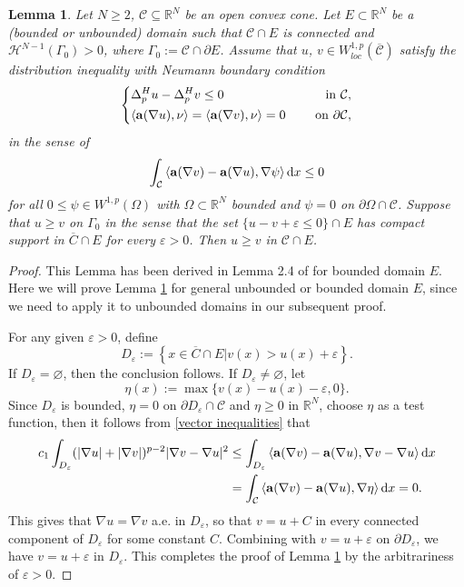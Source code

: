 \documentclass[12pt]{amsart}
\newtheorem{lem}[thm]{Lemma}
\theoremstyle{definition}
\theoremstyle{remark}
\theoremstyle{conclusion}
\theoremstyle{conjecture}
\numberwithin{equation}{section}
\begin{document}
\begin{lem}\label{weak comparison}
Let $N\geq2$, $\mathcal{C}\subseteq\mathbb{R}^{N}$ be an open convex cone. Let $E\subset\mathbb{R}^{N}$ be a (bounded or unbounded) domain such that $\mathcal{C}\cap E$ is connected and $\mathcal{H}^{N-1}(\Gamma_0)>0$, where $\Gamma_0:=\mathcal{C}\cap \partial E$. Assume that $u$, $v\in W^{1,p}_{loc}(\overline{\mathcal{C}})$ satisfy the distribution inequality with Neumann boundary condition
 \begin{equation*}
     \left\{
         \begin{aligned}
             &\Delta ^{H}_{p}u-\Delta ^{H}_{p}v \leq 0\ &\rm{in}\,\, \mathcal{C}, \\
             &\langle {\bf{a}}(\nabla u),\nu\rangle=\langle {\bf{a}}(\nabla v),\nu\rangle=0 \quad\,\, &\rm{on}\,\, \partial\mathcal{C},
             \end{aligned}
             \right.
    \end{equation*}
in the sense of
$$\int_{\mathcal{C}}\left\langle {\bf{a}}(\nabla v)-{\bf{a}}(\nabla u),\nabla \psi\right\rangle \mathrm{d}x\leq0$$
for all $0\leq\psi\in W^{1,p}(\Omega)$ with $\Omega\subset\mathbb{R}^N$ bounded and $\psi=0$ on $\partial\Omega\cap \mathcal{C}$. Suppose that $u\geq v$ on $\Gamma_0$ in the sense that the set $\{u-v+\varepsilon\leq0\}\cap E$ has compact support in $\overline{C}\cap E$ for every $\varepsilon>0$. Then $u\geq v$ in $\mathcal{C}\cap E$.
\end{lem}
\begin{proof}
This Lemma has been derived in Lemma 2.4 of \cite{CL} for bounded domain $E$. Here we will prove Lemma \ref{weak comparison} for general unbounded or bounded domain $E$, since we need to apply it to unbounded domains in our subsequent proof.

For any given $\varepsilon>0$, define
$$D_{\varepsilon}:=\left\{x\in\overline{C}\cap E|v(x)>u(x)+\varepsilon\right\}.$$
If $D_{\varepsilon}=\varnothing $, then the conclusion follows. If $D_{\varepsilon}\neq\varnothing $, let
$$\eta(x):=\max\{v(x)-u(x)-\varepsilon,0\}.$$
Since $D_{\varepsilon}$ is bounded, $\eta=0$ on $\partial D_{\varepsilon}\cap\mathcal{C}$ and $\eta\geq0$ in $\mathbb{R}^N$, choose $\eta$ as a test function, then it follows from  \eqref{vector inequalities} that
\begin{equation*}
\begin{aligned}
  c_1\int_{D_{\varepsilon}}(|\nabla u|+|\nabla v|)^{p-2}|\nabla v-\nabla u|^2
  &\leq\int_{D_{\varepsilon}}\left\langle {\bf{a}}(\nabla v)-{\bf{a}}(\nabla u),\nabla v-\nabla u\right\rangle \mathrm{d}x\\
  &=\int_{\mathcal{C}}\left\langle {\bf{a}}(\nabla v)-{\bf{a}}(\nabla u),\nabla \eta\right\rangle \mathrm{d}x=0.
  \end{aligned}
\end{equation*}
This gives that $\nabla u=\nabla v$ a.e. in $D_{\varepsilon}$, so that $v=u+C$ in every connected component of $D_{\varepsilon}$ for some constant $C$. Combining with $v=u+\varepsilon$ on $\partial D_{\varepsilon}$, we have $v=u+\varepsilon$ in $D_{\varepsilon}$. This completes the proof of Lemma \ref{weak comparison} by the arbitrariness of $\varepsilon>0$.
\end{proof}
\end{document}
